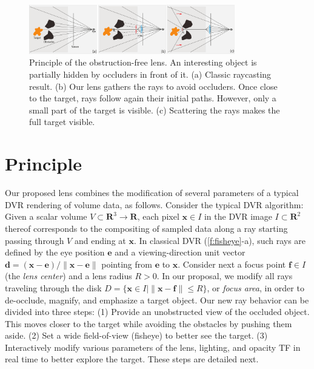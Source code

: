 \begin{figure}[htbp]
\centering
\includegraphics [width=0.8\textwidth]{images/principle.pdf}
\vspace{-0.15cm}
\caption{Principle of the obstruction-free lens. An interesting object is partially hidden by occluders in front of it. (a) Classic raycasting result. (b) Our lens gathers the rays to avoid occluders. Once close to the target, rays follow again their initial paths. However, only a small part of the target is visible. (c) Scattering the rays makes the full target visible.}
\label{f:fisheye}
\vspace{-0.15cm}
\end{figure}

\section{Principle}
\label{sec:principle}
%
%
Our proposed lens combines the modification of several parameters of a typical DVR rendering of volume data, as follows. Consider the typical DVR algorithm: Given a scalar volume $V \subset \mathbf{R}^3 \rightarrow \mathbf{R}$, each pixel $\mathbf{x} \in I$ in the DVR image $I \subset \mathbf{R}^2$ thereof corresponds to the compositing of sampled data along a ray starting passing through $V$ and ending at $\mathbf{x}$. In classical DVR (\autoref{f:fisheye}-a), such rays are defined by the eye position $\mathbf{e}$ and a viewing-direction unit vector $\mathbf{d} = (\mathbf{x} - \mathbf{e}) / \| \mathbf{x} - \mathbf{e} \|$ pointing from $\mathbf{e}$ to $\mathbf{x}$. Consider next a focus point $\mathbf{f} \in I$ (the \emph{lens center}) and a lens radius $R > 0$. In our proposal, we modify all rays traveling through the disk $D = \{\mathbf{x} \in I | \| \mathbf{x} - \mathbf{f} \| \leq R\}$, or \emph{focus area}, in order to de-occlude, magnify, and emphasize a target object. Our new ray behavior can be divided into three steps: (1) Provide an unobstructed view of the occluded object. This moves closer to the target while avoiding the obstacles by pushing them aside. (2) Set a wide field-of-view (fisheye) to better see the target. (3) Interactively modify various parameters of the lens, lighting, and opacity TF in real time to better explore the target. These steps are detailed next.

